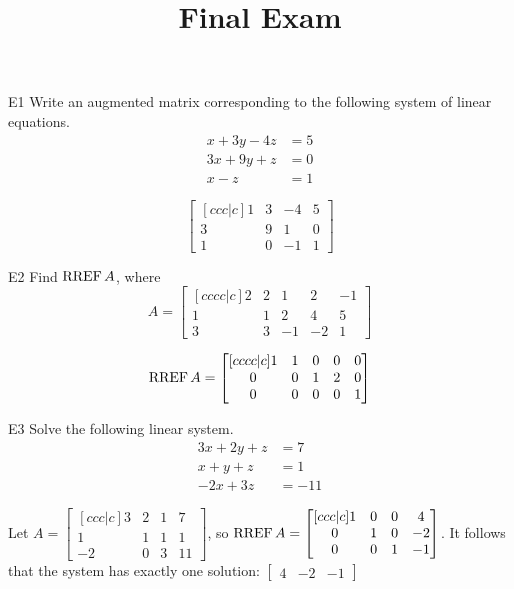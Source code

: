 \documentclass{sbgLAexam}
\title{Final Exam}
\begin{document}
\begin{problem}{E1}
Write an augmented matrix corresponding to the following system of linear equations.
\begin{align*}
x+3y-4z &= 5 \\
3x+9y+z &= 0 \\
x-z &= 1
\end{align*}
\end{problem}
\begin{solution}
\[
\begin{bmatrix}[ccc|c]
1 & 3 & -4 & 5 \\
3 & 9 & 1 & 0 \\
1 & 0 & -1 & 1
\end{bmatrix}
\]
\end{solution}

\begin{problem}{E2}
Find \(\operatorname{RREF} A\), where
\[
  A =
  \begin{bmatrix}[cccc|c]
    2 & 2 & 1 & 2 & -1 \\
    1 & 1 & 2 & 4 & 5 \\
    3 & 3 & -1 & -2 & 1
  \end{bmatrix}
\]
\end{problem}
\begin{solution}
\[
  \operatorname{RREF} A =
  \begin{bmatrix}[cccc|c]
    1 & 1 & 0 & 0 & 0 \\
    0 & 0 & 1 & 2 & 0 \\
    0 & 0 & 0 & 0 & 1
  \end{bmatrix}
\]
\end{solution}
\begin{extract}\newpage\end{extract}
\begin{problem}{E3}
Solve the following linear system.
\begin{align*}
3x+2y+z &= 7 \\
x+y+z &= 1 \\
-2x+3z &= -11
\end{align*}
\end{problem}
\begin{solution}
Let \(A =
  \begin{bmatrix}[ccc|c]
    3 & 2 & 1 & 7 \\
    1 & 1 & 1 & 1 \\
    -2 & 0 & 3 & 11
  \end{bmatrix}
\), so \(\operatorname{RREF} A =
  \begin{bmatrix}[ccc|c]
    1 & 0 & 0 & 4 \\
    0 & 1 & 0 & -2 \\
    0 & 0 & 1 & -1
  \end{bmatrix}
\). It follows that the system has exactly one solution:
\(\begin{bmatrix}
  4 & -2 & -1
\end{bmatrix}\)
\end{solution}
\end{document}
